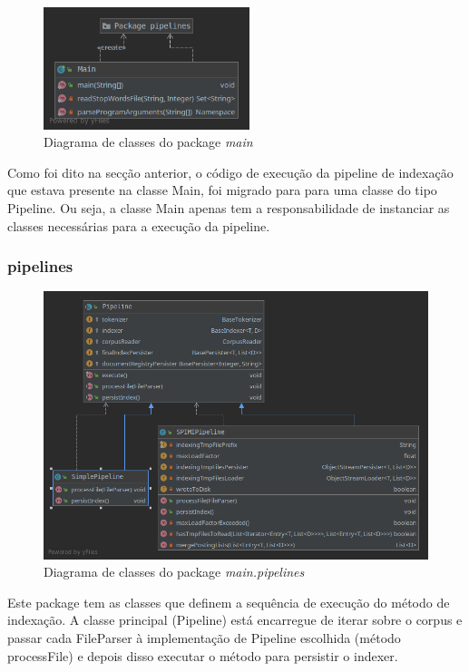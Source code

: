 \documentclass[12pt]{article}
\begin{document}
\begin{figure}[h]
  \center
  \includegraphics[width=6cm]{packages_main.png}
  \caption{Diagrama de classes do package \it main}
\end{figure}


Como foi dito na secção anterior, o código de execução da pipeline
de indexação que estava presente na classe Main, foi migrado para
para uma classe do tipo Pipeline. Ou seja, a classe Main apenas
tem a responsabilidade de instanciar as classes necessárias para
a execução da pipeline.

\subsubsection{pipelines}

\begin{figure}[h]
  \center
  \includegraphics[width=14cm]{packages_main_pipelines.png}
  \caption{Diagrama de classes do package \it main.pipelines}
\end{figure}

Este package tem as classes que definem a sequência de execução
do método de indexação. A classe principal (Pipeline) está encarregue
de iterar sobre o corpus e passar cada FileParser à implementação
de Pipeline escolhida (método processFile) e depois disso executar
o método para persistir o indexer.
\end{document}
